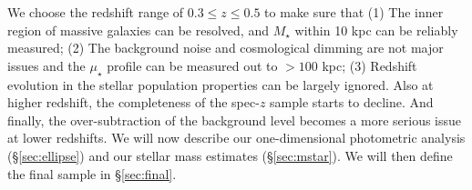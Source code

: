 \documentclass[a4paper,fleqn,usenatbib]{mnras}
\def\msun{$M_\odot$}
\def\mstar{{$M_{\star}$}}
\def\logms{{$\log (M_{\star}/M_{\odot})$}}
\def\mden{{$\mu_{\star}$}}
\begin{document}
    We choose the redshift range of $0.3 \leq z \leq 0.5$ to make sure that 
    (1) The inner region of massive galaxies can be resolved, and \mstar{} within 
    10 kpc can be reliably measured; 
    (2) The background noise and cosmological dimming are not major issues and the 
    \mden{} profile can be measured out to $>100$ kpc; 
    (3) Redshift evolution in the stellar population properties can be largely 
    ignored.  
    Also at higher redshift, the completeness of the spec-$z$ sample starts to decline. 
    And finally, the over-subtraction of the background level becomes a more serious 
    issue at lower redshifts.  
    We will now describe our one-dimensional photometric analysis (\S \ref{sec:ellipse}) 
    and our stellar mass estimates (\S \ref{sec:mstar}). 
    We will then define the final sample in \S \ref{sec:final}.
    
\end{document}
